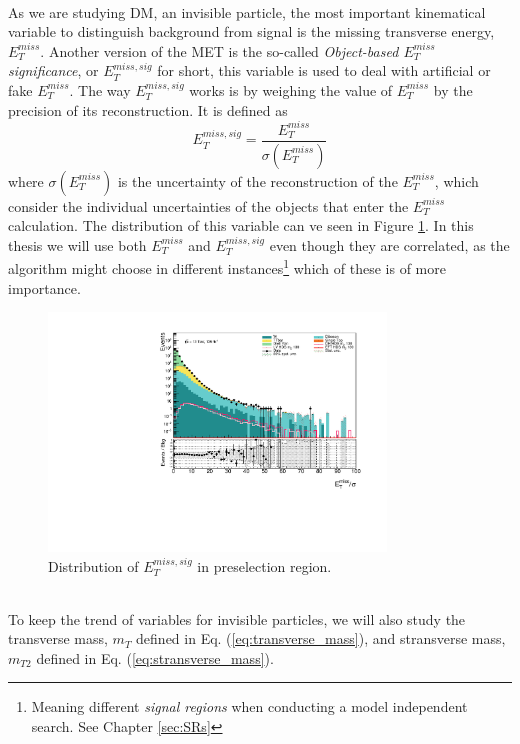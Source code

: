 \documentclass[12pt, a4paper]{book}
\begin{document}
\\As we are studying DM, an invisible particle, the most important kinematical variable to distinguish background from signal is the missing transverse energy, $E_T^{miss}$.
Another version of the MET is the so-called \textit{Object-based $E_T^{miss}$ significance}, or $E_T^{miss,sig}$ for short, this variable is used to deal with artificial or fake $E_T^{miss}$. The way $E_T^{miss,sig}$ works is by 
weighing the value of $E_T^{miss}$ by the precision of its reconstruction. It is defined as
\begin{equation}\label{eq:METsig}
    E_T^{miss,sig} = \frac{E_T^{miss}}{\sigma(E_T^{miss})}
\end{equation}
where $\sigma(E_T^{miss})$ is the uncertainty of the reconstruction of the $E_T^{miss}$, which consider the individual uncertainties of the objects that enter the $E_T^{miss}$ calculation. The distribution of this variable can ve seen in Figure \ref{fig:met_sig_dist}. 
In this thesis we will use both $E_T^{miss}$ and $E_T^{miss,sig}$ even though they are correlated, as the algorithm might choose in different instances\footnote{Meaning different \textit{signal regions} when conducting a model independent search. See Chapter \ref{sec:SRs}} 
which of these is of more importance.\\
\begin{figure}[!ht]
    \centering
        \includegraphics[width=0.8\textwidth]{met_sig.pdf}
    \caption{Distribution of $E_{T}^{miss,sig}$ in preselection region.}\label{fig:met_sig_dist}
\end{figure}
\\To keep the trend of variables for invisible particles, we will also study the transverse mass, $m_T$ defined in Eq. (\ref{eq:transverse_mass}), and stransverse mass, $m_{T2}$ defined in Eq. (\ref{eq:stransverse_mass}). 
\end{document}
